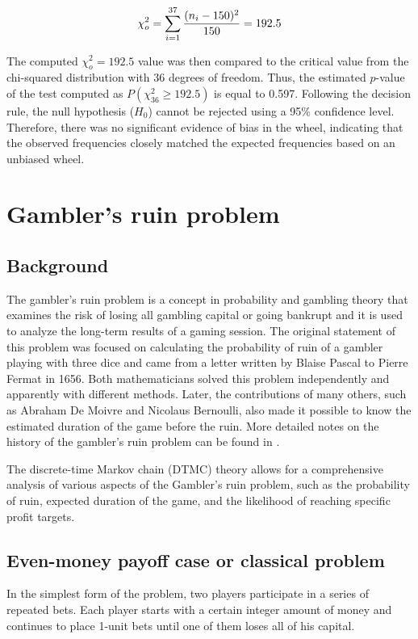 \documentclass[11pt,twoside]{article}
\numberwithin{Theorem}{section}
\numberwithin{Definition}{section}
\numberwithin{Lemma}{section}
\numberwithin{Algorithm}{section}
\numberwithin{equation}{section}
\begin{document}
\begin{equation}
\chi_{o}^2 = \sum_{i=1}^{37}\frac{(n_{i} - 150)^2}{150} = 192.5 \notag
\end{equation}

The computed $\chi_{o}^2 = 192.5$ value was then compared to the critical value from the chi-squared distribution with $36$ degrees of freedom. Thus, the estimated $p$-value of the test computed as $P(\chi_{36}^2 \geq 192.5)$ is equal to 0.597. Following the decision rule, the null hypothesis ($H_{0}$) cannot be rejected using a 95\% confidence level. Therefore, there was no significant evidence of bias in the wheel, indicating that the observed frequencies closely matched the expected frequencies based on an unbiased wheel.

\section{Gambler's ruin problem}\label{Gambler}
\subsection{Background}
The gambler's ruin problem is a concept in probability and gambling theory that examines the risk of losing all gambling capital or going bankrupt and it is used to analyze the long-term results of a gaming session. The original statement of this problem was focused on calculating the probability of ruin of a gambler playing with three dice and came from a letter written by Blaise Pascal to Pierre Fermat in 1656. Both mathematicians solved this problem independently and apparently with different methods. Later, the contributions of many others, such as Abraham De Moivre and Nicolaus Bernoulli, also made it possible to know the estimated duration of the game before the ruin. More detailed notes on the history of the gambler's ruin problem can be found in \cite{chances, history}.


The discrete-time Markov chain (DTMC) theory allows for a comprehensive analysis of various aspects of the Gambler's ruin problem, such as the probability of ruin, expected duration of the game, and the likelihood of reaching specific profit targets.


\subsection{Even-money payoff case or classical problem}
In the simplest form of the problem, two players participate in a series of repeated bets. Each player starts with a certain integer amount of money and continues to place 1-unit bets until one of them loses all of his capital. 
\end{document}
